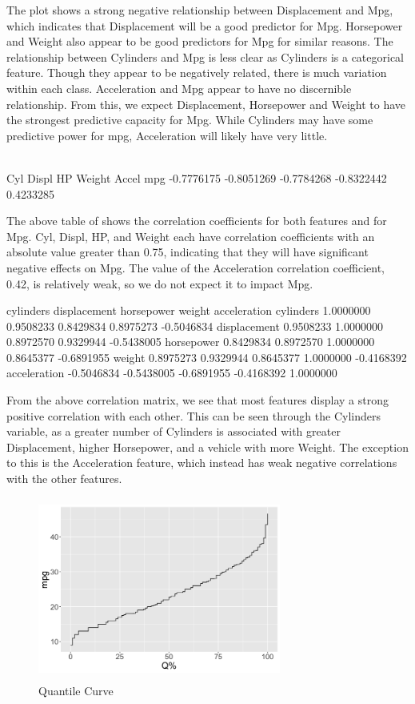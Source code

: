 \documentclass{homework}
\begin{document}
\question
The plot shows a strong negative relationship between Displacement and Mpg, which indicates that Displacement will be a good predictor for Mpg. Horsepower and Weight also appear to be good predictors for Mpg for similar reasons. The relationship between Cylinders and Mpg is less clear as Cylinders is a categorical feature. Though they appear to be negatively related, there is much variation within each class. Acceleration and Mpg appear to have no discernible relationship. From this, we expect Displacement, Horsepower and Weight to have the strongest predictive capacity for Mpg. While Cylinders may have some predictive power for mpg, Acceleration will likely have very little.
\\
\\
\question
\begin{rc}
           Cyl      Displ         HP     Weight     Accel
mpg -0.7776175 -0.8051269 -0.7784268 -0.8322442 0.4233285
\end{rc}
The above table of shows the correlation coefficients for both features and for Mpg. Cyl, Displ, HP, and Weight each have correlation coefficients with an absolute value greater than 0.75, indicating that they will have significant negative effects on Mpg. The value of the Acceleration correlation coefficient, 0.42, is relatively weak, so we do not expect it to impact Mpg.

\question
\begin{rc}
              cylinders displacement horsepower     weight acceleration
cylinders     1.0000000    0.9508233  0.8429834  0.8975273   -0.5046834
displacement  0.9508233    1.0000000  0.8972570  0.9329944   -0.5438005
horsepower    0.8429834    0.8972570  1.0000000  0.8645377   -0.6891955
weight        0.8975273    0.9329944  0.8645377  1.0000000   -0.4168392
acceleration -0.5046834   -0.5438005 -0.6891955 -0.4168392    1.0000000
\end{rc}
From the above correlation matrix, we see that most features display a strong positive correlation with each other. This can be seen through the Cylinders variable, as a greater number of Cylinders is associated with greater Displacement, higher Horsepower, and a vehicle with more Weight. The exception to this is the Acceleration feature, which instead has weak negative correlations with the other features.

\question
\begin{figure}[h]
    \centering
    \includegraphics[width=8cm,height=6cm]{Images/Qcurve.png}
    \caption{Quantile Curve}
    \label{fig:my_label}
\end{figure}
\end{document}
